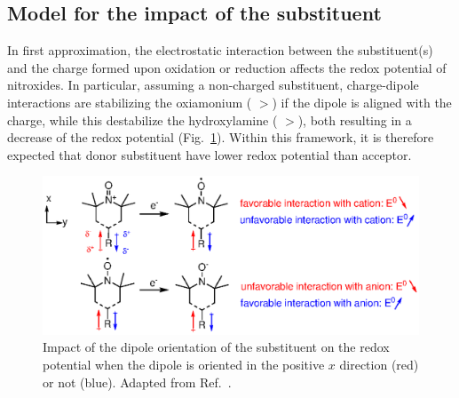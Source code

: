 \documentclass[review]{elsarticle}
\begin{document}

\subsection{Model for the impact of the substituent}

In first approximation, the electrostatic interaction between the substituent(s) and the charge formed upon oxidation or reduction affects the redox potential of nitroxides. In particular, assuming a non-charged substituent, charge-dipole interactions are stabilizing the oxiamonium ( $>$) if the dipole is aligned with the charge, while this destabilize the hydroxylamine ( $>$), both resulting in a decrease of the redox potential (Fig.~\ref{fig:dipole}). Within this framework, it is therefore expected that donor substituent have lower redox potential than acceptor.

\begin{figure}[!h]
	\centering
	\includegraphics[width=.7\linewidth]{Figure2}
	\caption{Impact of the dipole orientation of the substituent on the redox potential when the dipole is oriented in  the positive $x$ direction (red) or not (blue). Adapted from Ref.~.}
	\label{fig:dipole}
\end{figure}
\end{document}
